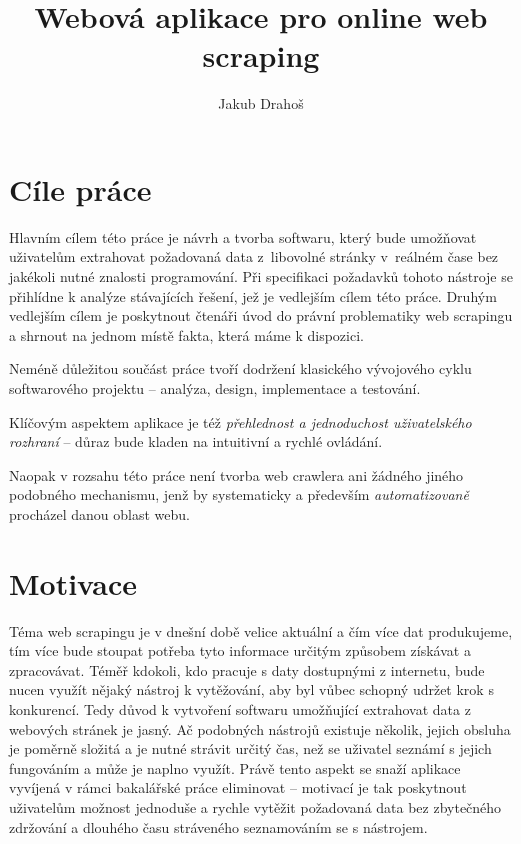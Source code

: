 \documentclass[thesis=B,czech]{FITthesis}[2012/06/26]
\title{Webová aplikace pro online web scraping}
\author{Jakub Drahoš} %
\begin{document}

\begin{introduction}
	\vfill
	\section*{Cíle práce}
	Hlavním cílem této práce je návrh a tvorba softwaru, který bude umožňovat uživatelům extrahovat požadovaná data z~libovolné stránky v~reálném čase bez jakékoli nutné znalosti programování. Při specifikaci požadavků tohoto nástroje se přihlídne k analýze stávajících řešení, jež je vedlejším cílem této práce. Druhým vedlejším cílem je poskytnout čtenáři úvod do právní problematiky web scrapingu a shrnout na jednom místě fakta, která máme k dispozici.
	
	Neméně důležitou součást práce tvoří dodržení klasického vývojového cyklu softwarového projektu -- analýza, design, implementace a testování.
	
	Klíčovým aspektem aplikace je též \emph{přehlednost a jednoduchost uživatelského rozhraní} -- důraz bude kladen na intuitivní a rychlé ovládání.
	
	Naopak v rozsahu této práce není tvorba web crawlera ani žádného jiného podobného mechanismu, jenž by systematicky a především \emph{automatizovaně} procházel danou oblast webu.
	
	\section*{Motivace}
	Téma web scrapingu je v dnešní době velice aktuální a čím více dat produkujeme, tím více bude stoupat potřeba tyto informace určitým způsobem získávat a zpracovávat. Téměř kdokoli, kdo pracuje s daty dostupnými z internetu, bude nucen využít nějaký nástroj k vytěžování, aby byl vůbec schopný udržet krok s konkurencí.
	\newpage
	Tedy důvod k vytvoření softwaru umožňující extrahovat data z webových stránek je jasný. Ač podobných nástrojů existuje několik, jejich obsluha je poměrně složitá a je nutné strávit určitý čas, než se uživatel seznámí s jejich fungováním a může je naplno využít. Právě tento aspekt se snaží aplikace vyvíjená v rámci bakalářské práce eliminovat -- motivací je tak poskytnout uživatelům možnost jednoduše a rychle vytěžit požadovaná data bez zbytečného zdržování a dlouhého času stráveného seznamováním se s nástrojem.
	

\end{introduction}
\end{document}
